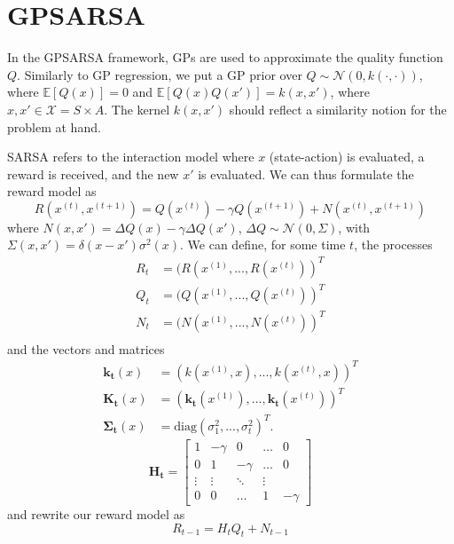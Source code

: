 \documentclass[10pt, twocolumn, twoside]{article}
\begin{document}
\section{GPSARSA}
In the GPSARSA framework, GPs are used to approximate the quality function $Q$. Similarly to GP regression,
we put a GP prior over $Q \sim \mathcal{N}(0, k(\cdot, \cdot))$, where $\mathbb{E}[Q(x)] = 0$ and
$\mathbb{E}[Q(x)Q(x')] = k(x, x')$, where $x, x' \in \mathcal{X} = S \times A$. The kernel $k(x, x')$
should reflect a similarity notion for the problem at hand.

SARSA refers to the interaction model where $x$ (state-action) is evaluated, a reward is received,
and the new $x'$ is evaluated. We can thus formulate the reward model as
\begin{equation*}
R(x^{(t)}, x^{(t+1)}) = Q(x^{(t)}) - \gamma Q(x^{(t+1)}) + N(x^{(t)}, x^{(t+1)})
\end{equation*}
where $N(x, x') = \Delta Q(x) - \gamma \Delta Q(x')$, $\Delta Q \sim \mathcal{N}(0,\Sigma)$,
with $\Sigma(x, x') = \delta(x - x')\sigma^2(x)$. We can define, for some time $t$, the processes
\begin{align*}
R_t &= (R(x^{(1)},..., R(x^{(t)}))^T \\
Q_t &= (Q(x^{(1)},..., Q(x^{(t)}))^T \\
N_t &= (N(x^{(1)},..., N(x^{(t)}))^T \\
\end{align*}
and the vectors and matrices
\begin{align*}
\mathbf{k_t}(x) &= (k(x^{(1)}, x), ..., k(x^{(t)}, x))^T\\
\mathbf{K_t}(x) &= (\mathbf{k_t}(x^{(1)}), ..., \mathbf{k_t}(x^{(t)}))^T\\
\mathbf{\Sigma_t}(x) &= \textrm{diag}(\sigma_1^2,...,\sigma_t^2)^T.
\end{align*}
$$\mathbf{H_t} =
\begin{bmatrix}
1 & -\gamma & 0 & \ldots & 0 \\
0 & 1 & -\gamma & \ldots & 0 \\
\vdots & \vdots & \ddots & \vdots \\
0 & 0 & \ldots & 1 & -\gamma
\end{bmatrix}$$ and rewrite our reward model as
\begin{equation}
R_{t-1} = H_t Q_t + N_{t-1}
\end{equation}

\newcommand{\Ht}{\mathbf{H_t}}
\newcommand{\Qt}{\mathbf{Q_t}}
\newcommand{\kt}{\mathbf{k_t}}
\newcommand{\Kt}{\mathbf{K_t}}
\newcommand{\St}{\mathbf{\Sigma_{t-1}}}
\end{document}
